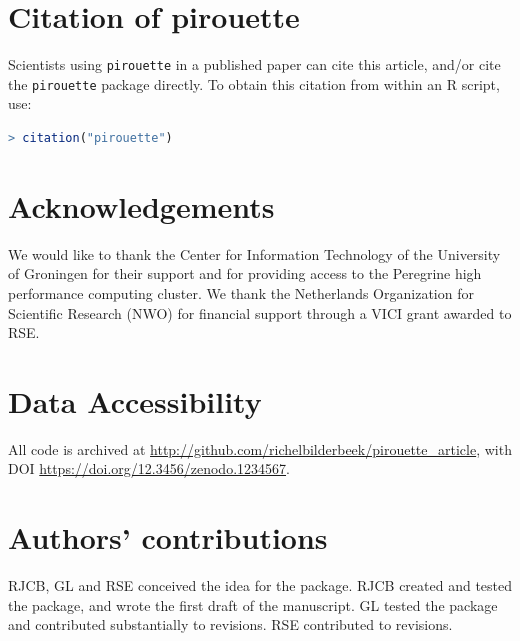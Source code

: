 \documentclass{article}
\begin{document}
\section{Citation of pirouette}

Scientists using \verb;pirouette; in a published paper can cite this
article, and/or cite the \verb;pirouette; package 
directly. To obtain this citation from within an R script, use:

\begin{lstlisting}[language=R]
> citation("pirouette")
\end{lstlisting}

\section{Acknowledgements}

We would like to thank the Center for Information Technology of the University 
of Groningen for their support and for providing access to the Peregrine 
high performance computing cluster. 
We thank the Netherlands 
Organization for Scientific Research (NWO) for financial support 
through a VICI grant awarded to RSE.

\section{Data Accessibility}

All code is archived at \url{http://github.com/richelbilderbeek/pirouette_article},
with DOI \url{https://doi.org/12.3456/zenodo.1234567}.

\section{Authors' contributions}

RJCB, GL and RSE conceived the idea for the package. 
RJCB created and tested the package, and wrote the first draft of the manuscript.
GL tested the package and contributed substantially to revisions.
RSE contributed to revisions.



\end{document}
